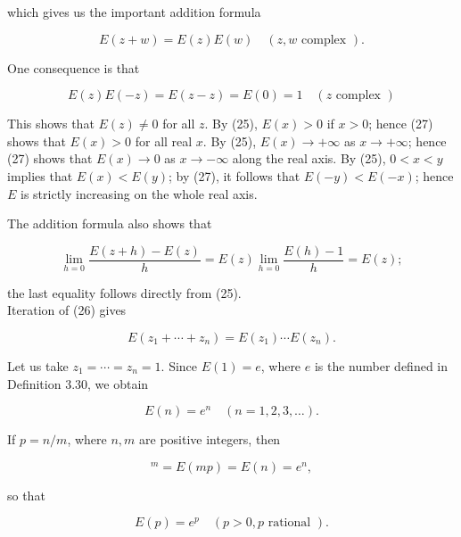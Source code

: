 \documentclass[10pt]{article}
\begin{document}
which gives us the important addition formula


\begin{equation*}
E(z+w)=E(z) E(w) \quad(z, w \text { complex }) . \tag{26}
\end{equation*}


One consequence is that


\begin{equation*}
E(z) E(-z)=E(z-z)=E(0)=1 \quad(z \text { complex }) \tag{27}
\end{equation*}


This shows that $E(z) \neq 0$ for all $z$. By (25), $E(x)>0$ if $x>0$; hence (27) shows that $E(x)>0$ for all real $x$. By (25), $E(x) \rightarrow+\infty$ as $x \rightarrow+\infty$; hence (27) shows that $E(x) \rightarrow 0$ as $x \rightarrow-\infty$ along the real axis. By (25), $0<x<y$ implies that $E(x)<E(y)$; by (27), it follows that $E(-y)<E(-x)$; hence $E$ is strictly increasing on the whole real axis.

The addition formula also shows that


\begin{equation*}
\lim _{h=0} \frac{E(z+h)-E(z)}{h}=E(z) \lim _{h=0} \frac{E(h)-1}{h}=E(z) ; \tag{28}
\end{equation*}


the last equality follows directly from (25).\\
Iteration of (26) gives


\begin{equation*}
E\left(z_{1}+\cdots+z_{n}\right)=E\left(z_{1}\right) \cdots E\left(z_{n}\right) . \tag{29}
\end{equation*}


Let us take $z_{1}=\cdots=z_{n}=1$. Since $E(1)=e$, where $e$ is the number defined in Definition 3.30, we obtain


\begin{equation*}
E(n)=e^{n} \quad(n=1,2,3, \ldots) . \tag{30}
\end{equation*}


If $p=n / m$, where $n, m$ are positive integers, then


\begin{equation*}
[E(p)]^{m}=E(m p)=E(n)=e^{n}, \tag{31}
\end{equation*}


so that


\begin{equation*}
E(p)=e^{p} \quad(p>0, p \text { rational }) . \tag{32}
\end{equation*}
\end{document}
